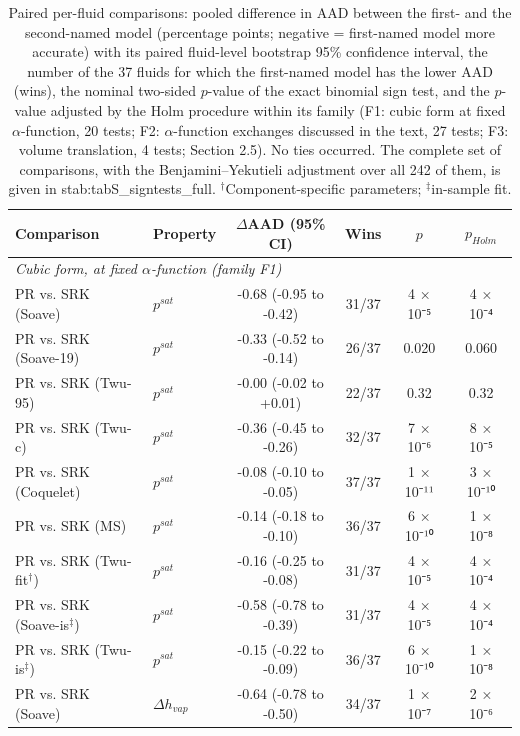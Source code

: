 \begin{table}[H]
\centering
\caption{Paired per-fluid comparisons: pooled difference in AAD between the first- and the second-named model (percentage points; negative = first-named model more accurate) with its paired fluid-level bootstrap 95\% confidence interval, the number of the 37 fluids for which the first-named model has the lower AAD (wins), the nominal two-sided $p$-value of the exact binomial sign test, and the $p$-value adjusted by the Holm procedure within its family (F1: cubic form at fixed $\alpha$-function, 20 tests; F2: $\alpha$-function exchanges discussed in the text, 27 tests; F3: volume translation, 4 tests; Section 2.5). No ties occurred. The complete set of comparisons, with the Benjamini--Yekutieli adjustment over all 242 of them, is given in {stab:tabS_signtests_full}. $^{\dagger}$Component-specific parameters; $^{\ddagger}$in-sample fit.}
\label{tab:tab_signtests}
\small
\begin{tabular}{llcccc}
\toprule
Comparison & Property & $\Delta$AAD (95\% CI) & Wins & $p$ & $p_{Holm}$ \\
\midrule
\multicolumn{6}{l}{\emph{Cubic form, at fixed $\alpha$-function (family F1)}} \\
PR vs. SRK (Soave) & $p^{sat}$ & -0.68 (-0.95 to -0.42) & 31/37 & 4 × 10⁻⁵ & 4 × 10⁻⁴ \\
PR vs. SRK (Soave-19) & $p^{sat}$ & -0.33 (-0.52 to -0.14) & 26/37 & 0.020 & 0.060 \\
PR vs. SRK (Twu-95) & $p^{sat}$ & -0.00 (-0.02 to +0.01) & 22/37 & 0.32 & 0.32 \\
PR vs. SRK (Twu-c) & $p^{sat}$ & -0.36 (-0.45 to -0.26) & 32/37 & 7 × 10⁻⁶ & 8 × 10⁻⁵ \\
PR vs. SRK (Coquelet) & $p^{sat}$ & -0.08 (-0.10 to -0.05) & 37/37 & 1 × 10⁻¹¹ & 3 × 10⁻¹⁰ \\
PR vs. SRK (MS) & $p^{sat}$ & -0.14 (-0.18 to -0.10) & 36/37 & 6 × 10⁻¹⁰ & 1 × 10⁻⁸ \\
PR vs. SRK (Twu-fit$^{\dagger}$) & $p^{sat}$ & -0.16 (-0.25 to -0.08) & 31/37 & 4 × 10⁻⁵ & 4 × 10⁻⁴ \\
PR vs. SRK (Soave-is$^{\ddagger}$) & $p^{sat}$ & -0.58 (-0.78 to -0.39) & 31/37 & 4 × 10⁻⁵ & 4 × 10⁻⁴ \\
PR vs. SRK (Twu-is$^{\ddagger}$) & $p^{sat}$ & -0.15 (-0.22 to -0.09) & 36/37 & 6 × 10⁻¹⁰ & 1 × 10⁻⁸ \\
PR vs. SRK (Soave) & $\Delta h_{vap}$ & -0.64 (-0.78 to -0.50) & 34/37 & 1 × 10⁻⁷ & 2 × 10⁻⁶ \\

\end{tabular}
\end{table}
